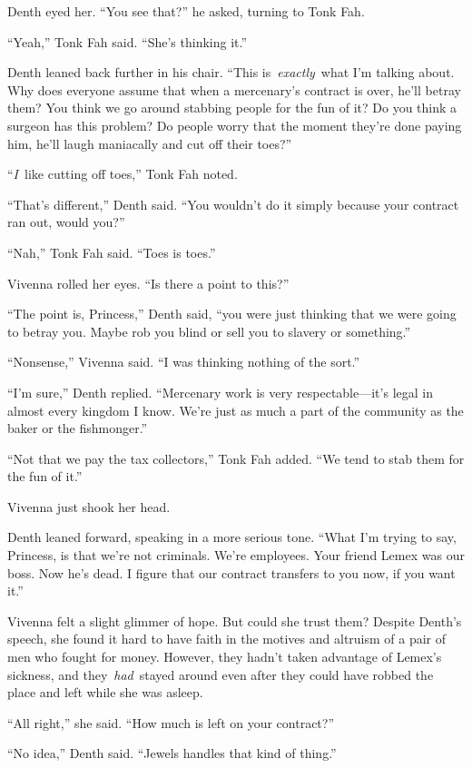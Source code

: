 Denth eyed her. “You see that?” he asked, turning to Tonk Fah.

“Yeah,” Tonk Fah said. “She’s thinking it.”

Denth leaned back further in his chair. “This is~\textit{exactly}~what I’m talking about. Why does everyone assume that when a mercenary’s contract is over, he’ll betray them? You think we go around stabbing people for the fun of it? Do you think a surgeon has this problem? Do people worry that the moment they’re done paying him, he’ll laugh maniacally and cut off their toes?”

“\textit{I}~like cutting off toes,” Tonk Fah noted.

“That’s different,” Denth said. “You wouldn’t do it simply because your contract ran out, would you?”

“Nah,” Tonk Fah said. “Toes is toes.”

Vivenna rolled her eyes. “Is there a point to this?”

“The point is, Princess,” Denth said, “you were just thinking that we were going to betray you. Maybe rob you blind or sell you to slavery or something.”

“Nonsense,” Vivenna said. “I was thinking nothing of the sort.”

“I’m sure,” Denth replied. “Mercenary work is very respectable—it’s legal in almost every kingdom I know. We’re just as much a part of the community as the baker or the fishmonger.”

“Not that we pay the tax collectors,” Tonk Fah added. “We tend to stab them for the fun of it.”

Vivenna just shook her head.

Denth leaned forward, speaking in a more serious tone. “What I’m trying to say, Princess, is that we’re not criminals. We’re employees. Your friend Lemex was our boss. Now he’s dead. I figure that our contract transfers to you now, if you want it.”

Vivenna felt a slight glimmer of hope. But could she trust them? Despite Denth’s speech, she found it hard to have faith in the motives and altruism of a pair of men who fought for money. However, they hadn’t taken advantage of Lemex’s sickness, and they~\textit{had}~stayed around even after they could have robbed the place and left while she was asleep.

“All right,” she said. “How much is left on your contract?”

“No idea,” Denth said. “Jewels handles that kind of thing.”

